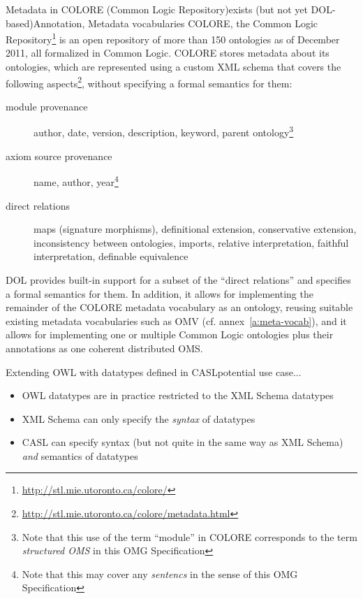 \documentclass[10pt,%
\ifpretendfinal
final%
\else
draft%
\fi,
]{scrreprt}
\makeatletter
\newcommand*{\cf}{cf.\@\xspace}
\newcommand*{\termref}[1]{\textit{#1}}
\newcommand*{\IS}{OMG Specification\xspace}
\newcommand{\annexrefname}{annex}
\newcommand{\aref}[1]{\annexrefname~\ref{#1}}
\makeatother
\begin{document}
\begin{usecase}{Metadata in COLORE (Common Logic Repository)}{exists (but not yet DOL-based)}{Annotation, Metadata vocabularies}
  COLORE, the Common Logic Repository\footnote{\url{http://stl.mie.utoronto.ca/colore/}} is an open repository of more than 150 ontologies as of December 2011, all formalized in Common Logic.  COLORE stores metadata about its ontologies, which are represented using a custom XML schema that covers the following aspects\footnote{\url{http://stl.mie.utoronto.ca/colore/metadata.html}}, without specifying a formal semantics for them:
  \begin{description}
  \item[module provenance] author, date, version, description, keyword, parent ontology\footnote{Note that this use of the term ``module'' in COLORE corresponds
to the term \termref{structured OMS} in this \IS}
  \item[axiom source provenance] name, author, year\footnote{Note that this may cover any \termref{sentencs} in the sense of this \IS}
  \item[direct relations] maps (signature morphisms), definitional extension, conservative extension, inconsistency between ontologies, imports, relative interpretation, faithful interpretation, definable equivalence
  \end{description}

  DOL provides built-in support for a subset of the ``direct relations'' and specifies a formal semantics for them.  In addition, it allows for implementing the remainder of the COLORE metadata vocabulary as an ontology, reusing suitable existing metadata vocabularies such as OMV (\cf \aref{a:meta-vocab}), and it allows for implementing one or multiple Common Logic ontologies plus their annotations as one coherent distributed OMS.
\end{usecase}

\begin{usecase}{Extending OWL with datatypes defined in CASL}{potential use case}{...}
  \begin{itemize}
  \item OWL datatypes are in practice restricted to the XML Schema datatypes
  \item XML Schema can only specify the \emph{syntax} of datatypes
  \item CASL can specify syntax (but not quite in the same way as XML Schema) \emph{and} semantics of datatypes
  \end{itemize}
\end{usecase}
\end{document}
